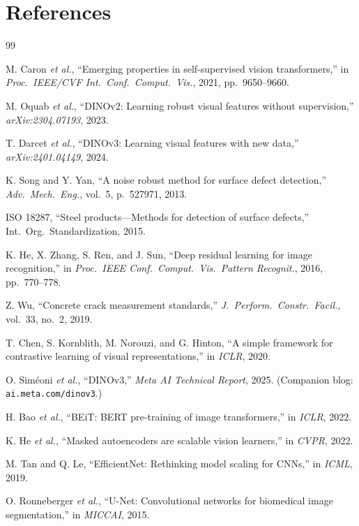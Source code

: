 \documentclass[journal]{IEEEtran}
\begin{document}
\section*{References}
\begin{thebibliography}{99}

 M. Caron \textit{et al.}, ``Emerging properties in self-supervised vision transformers,'' in \textit{Proc.\ IEEE/CVF Int.\ Conf.\ Comput.\ Vis.}, 2021, pp.~9650--9660.

 M. Oquab \textit{et al.}, ``DINOv2: Learning robust visual features without supervision,'' \textit{arXiv:2304.07193}, 2023.

 T. Darcet \textit{et al.}, ``DINOv3: Learning visual features with new data,'' \textit{arXiv:2401.04149}, 2024.

 K. Song and Y. Yan, ``A noise robust method for surface defect detection,'' \textit{Adv.\ Mech.\ Eng.}, vol.~5, p.~527971, 2013.

 ISO 18287, ``Steel products---Methods for detection of surface defects,'' Int.\ Org.\ Standardization, 2015.

 K. He, X. Zhang, S. Ren, and J. Sun, ``Deep residual learning for image recognition,'' in \textit{Proc.\ IEEE Conf.\ Comput.\ Vis.\ Pattern Recognit.}, 2016, pp.~770--778.

 Z. Wu, ``Concrete crack measurement standards,'' \textit{J.\ Perform.\ Constr.\ Facil.}, vol.~33, no.~2, 2019.

 T. Chen, S. Kornblith, M. Norouzi, and G. Hinton, ``A simple framework for contrastive learning of visual representations,'' in \textit{ICLR}, 2020.

 O. Sim\'eoni \textit{et al.}, ``DINOv3,'' \textit{Meta AI Technical Report}, 2025. (Companion blog: \texttt{ai.meta.com/dinov3}.)

 H. Bao \textit{et al.}, ``BEiT: BERT pre-training of image transformers,'' in \textit{ICLR}, 2022.

 K. He \textit{et al.}, ``Masked autoencoders are scalable vision learners,'' in \textit{CVPR}, 2022.

 M. Tan and Q. Le, ``EfficientNet: Rethinking model scaling for CNNs,'' in \textit{ICML}, 2019.

 O. Ronneberger \textit{et al.}, ``U-Net: Convolutional networks for biomedical image segmentation,'' in \textit{MICCAI}, 2015.


\end{thebibliography}
\end{document}
